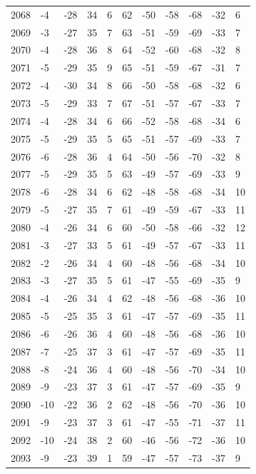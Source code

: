 \begin{table}[H]
\begin{tabular}{lllllllllll}
2068 & -4 & -28 & 34 & 6 & 62 & -50 & -58 & -68 & -32 & 6 \\
2069 & -3 & -27 & 35 & 7 & 63 & -51 & -59 & -69 & -33 & 7 \\
2070 & -4 & -28 & 36 & 8 & 64 & -52 & -60 & -68 & -32 & 8 \\
2071 & -5 & -29 & 35 & 9 & 65 & -51 & -59 & -67 & -31 & 7 \\
2072 & -4 & -30 & 34 & 8 & 66 & -50 & -58 & -68 & -32 & 6 \\
2073 & -5 & -29 & 33 & 7 & 67 & -51 & -57 & -67 & -33 & 7 \\
2074 & -4 & -28 & 34 & 6 & 66 & -52 & -58 & -68 & -34 & 6 \\
2075 & -5 & -29 & 35 & 5 & 65 & -51 & -57 & -69 & -33 & 7 \\
2076 & -6 & -28 & 36 & 4 & 64 & -50 & -56 & -70 & -32 & 8 \\
2077 & -5 & -29 & 35 & 5 & 63 & -49 & -57 & -69 & -33 & 9 \\
2078 & -6 & -28 & 34 & 6 & 62 & -48 & -58 & -68 & -34 & 10 \\
2079 & -5 & -27 & 35 & 7 & 61 & -49 & -59 & -67 & -33 & 11 \\
2080 & -4 & -26 & 34 & 6 & 60 & -50 & -58 & -66 & -32 & 12 \\
2081 & -3 & -27 & 33 & 5 & 61 & -49 & -57 & -67 & -33 & 11 \\
2082 & -2 & -26 & 34 & 4 & 60 & -48 & -56 & -68 & -34 & 10 \\
2083 & -3 & -27 & 35 & 5 & 61 & -47 & -55 & -69 & -35 & 9 \\
2084 & -4 & -26 & 34 & 4 & 62 & -48 & -56 & -68 & -36 & 10 \\
2085 & -5 & -25 & 35 & 3 & 61 & -47 & -57 & -69 & -35 & 11 \\
2086 & -6 & -26 & 36 & 4 & 60 & -48 & -56 & -68 & -36 & 10 \\
2087 & -7 & -25 & 37 & 3 & 61 & -47 & -57 & -69 & -35 & 11 \\
2088 & -8 & -24 & 36 & 4 & 60 & -48 & -56 & -70 & -34 & 10 \\
2089 & -9 & -23 & 37 & 3 & 61 & -47 & -57 & -69 & -35 & 9 \\
2090 & -10 & -22 & 36 & 2 & 62 & -48 & -56 & -70 & -36 & 10 \\
2091 & -9 & -23 & 37 & 3 & 61 & -47 & -55 & -71 & -37 & 11 \\
2092 & -10 & -24 & 38 & 2 & 60 & -46 & -56 & -72 & -36 & 10 \\
2093 & -9 & -23 & 39 & 1 & 59 & -47 & -57 & -73 & -37 & 9 \\

\end{tabular}
\end{table}
